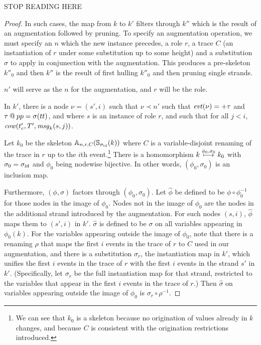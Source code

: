 \documentclass[12pt]{article}
\theoremstyle{definition}
\newcommand{\mcow}{\fn{cow}}
\newcommand{\evt}{\fn{evt}}
\newcommand{\msg}{\fn{msg}}
\newcommand{\mesg}{\msg}
\begin{document}
STOP READING HERE

\begin{proof}

In such cases, the map from $k$ to $k'$ filters through $k''$ which is the result of an augmentation
followed by pruning.  To specify an augmentation operation, we must specify an $n$ which the new instance
precedes, a role $r$, a trace $C$ (an instantiation of $r$ under some substitution up to some height) and
a substitution $\sigma$ to apply in conjunection with the augmentation.  This produces a pre-skeleton $k''_0$
and then $k''$ is the result of first hulling $k''_0$ and then pruning single strands.

$n'$ will serve as the $n$ for the augmentation, and $r$ will be the role.

In $k'$, there is a node $\nu = (s',i)$ such that $\nu \prec n'$ such that $\evt(\nu) = +\tau$ and $\tau
\mathbin{@} pp = \sigma(tt)$, and where $s$ is an instance of role $r$, and such that for all $j < i$,
$\mcow(t'_c,T',\mesg_k(s,j))$.


Let $k_0$ be the skeleton $\mathbb{A}_{n,r,C}(\mathbb{S}_{\sigma_{\mathrm{id}}}(k))$ where $C$ is a variable-disjoint
renaming of the trace in $r$ up to the $i$th event.\footnote{We can see that $k_0$ is a skeleton because
no origination of values already in $k$ changes, and because $C$ is consistent with the origination
restrictions introduced.}  There is a homomorphism $k \stackrel{\phi_0,\sigma_0}{\longmapsto} k_0$ with $\sigma_0 =
\sigma_{\mathrm{id}}$ and $\phi_0$ being nodewise bijective.  In other words, $(\phi_0, \sigma_0)$ is an inclusion map.

Furthermore, $(\phi,\sigma)$ factors through $(\phi_0,\sigma_0)$.  Let $\hat{\phi}$ be defined to be
$\phi \circ \phi_0^{-1}$ for those nodes in the image of $\phi_0$.  Nodes not in the image of $\phi_0$ are
the nodes in the additional strand introduced by the augmentation.  For such nodes $(s,i)$, $\hat{\phi}$
maps them to $(s',i)$ in $k'$.  $\hat{\sigma}$ is defined to be $\sigma$ on all variables appearing in
$\phi_0(k)$.  For the variables appearing outside the image of $\phi_0$, note that there is a renaming
$\rho$ that maps the first $i$ events in the trace of $r$ to $C$ used in our augmentation, and there is a
substitution $\sigma_r$, the instantiation map in $k'$, which unifies the first $i$ events in the trace of $r$
with the first $i$ events in the strand $s'$ in $k'$.  (Specifically, let $\sigma_r$ be the full instantiation
map for that strand, restricted to the variables that appear in the first $i$ events in the trace of $r$.)  Then
$\hat{\sigma}$ on variables appearing outside the image of $\phi_0$ is $\sigma_r \circ \rho^{-1}$.


\end{proof}
\end{document}
